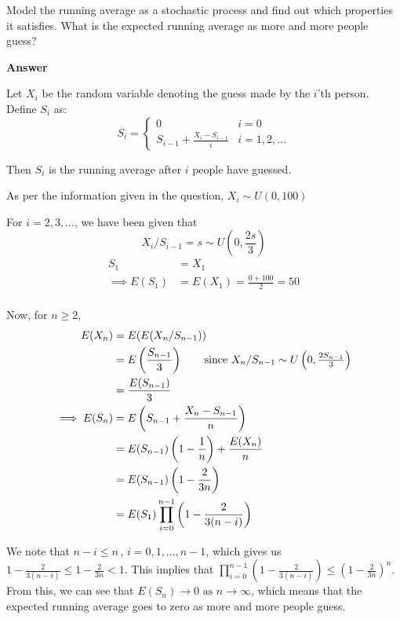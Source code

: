 \documentclass[12pt, oneside]{article}
\begin{document}
\begin{enumerate}
{    Model the running average as a stochastic process and find out which properties 
    it satisfies. What is the expected running average as more and more people guess?

    \textbf{Answer}

    Let \(X_i\) be the random variable denoting the guess made by the \(i\)'th person.
    Define \(S_i\) as:
    \[
        S_i = \begin{cases}
            0 & i = 0 \\
            S_{i-1} + \frac{X_i - S_{i - 1}}{i} & i = 1, 2, \ldots
        \end{cases}
    \]

    Then \(S_i\) is the running average after \(i\) people have guessed.
    
    As per the information given in the question, \(X_i \sim U(0, 100)\)

    For \(i = 2, 3, \ldots\), we have been given that
    \[X_i / S_{i - 1} = s \sim U\left(0, \frac{2s}{3}\right) \]
    \begin{align*}
        S_1 &= X_1 \\
        \implies E(S_1) &= E(X_1) = \frac{0 + 100}{2} = 50 \\
    \end{align*}

    Now, for \(n \geq 2\),
    \begin{align*}
        E(X_n) &= E(E(X_n / S_{n-1})) \\
               &= E\left(\frac{S_{n-1}}{3}\right) \tag*{since \(X_n / S_{n-1} \sim U\left(0, \frac{2S_{n-1}}{3}\right)\)}\\
               &= \frac{E(S_{n-1})}{3} \\
        \implies E(S_n) &= E\left(S_{n-1} + \frac{X_n - S_{n-1}}{n}\right) \\
                        &= E(S_{n-1})\left(1 - \frac{1}{n}\right)+ \frac{E(X_n)}{n} \\
                        &= E(S_{n - 1}) \left(1 - \frac{2}{3n}\right) \\
                        &= E(S_1) \prod_{i = 0}^{n-1}\left(1 - \frac{2}{3(n-i)}\right) \\
    \end{align*}

    We note that \(n - i \leq n \,,\, i = 0, 1, \ldots, n-1\), which gives us 
    \(1 - \frac{2}{3(n-i)} \leq 1 - \frac{2}{3n} < 1\). This implies that 
    \(\prod_{i = 0}^{n-1}\left(1 - \frac{2}{3(n-i)}\right) \leq \left(1 - \frac{2}{3n}\right)^n\).
    From this, we can see that \(E(S_n) \to 0 \text{ as } n \to \infty\), which means that the
    expected running average goes to zero as more and more people guess.

}
\end{enumerate}
\end{document}
